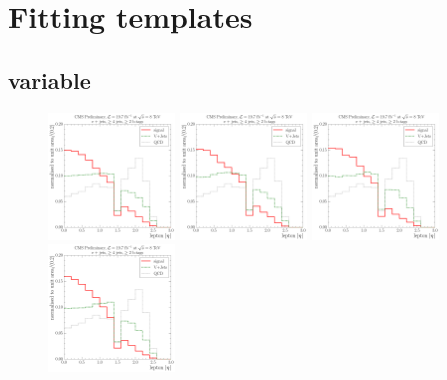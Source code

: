 \newpage



\chapter{Fitting templates}
\label{a:templates}


\centering
\section*{\HT variable}

\begin{figure}[!htbp]
	\centering
  	{\includegraphics[width=0.3\textwidth]{measurement/HT/central/fit_templates/electron_templates_bin_0-240}}
  	{\includegraphics[width=0.3\textwidth]{measurement/HT/central/fit_templates/electron_templates_bin_240-280}}
  	{\includegraphics[width=0.3\textwidth]{measurement/HT/central/fit_templates/electron_templates_bin_280-330}}\\
  	{\includegraphics[width=0.3\textwidth]{measurement/HT/central/fit_templates/electron_templates_bin_330-380}}

\end{figure}
